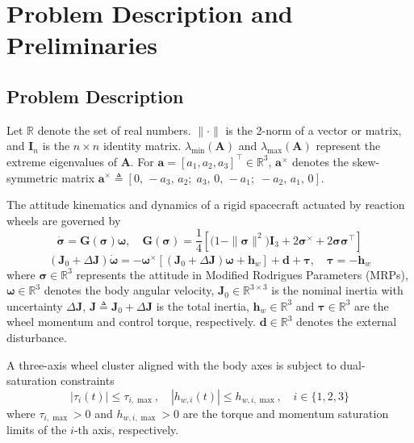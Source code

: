 \documentclass[journal]{new-aiaa}
\begin{document}
\section{Problem Description and Preliminaries}
\label{section:PROBLEM}

\subsection{Problem Description}
Let $\mathbb{R}$ denote the set of real numbers.
$\|\cdot\|$ is the 2-norm of a vector or matrix, and
$\boldsymbol{I}_n$ is the $n\times n$ identity matrix.
$\lambda_{\min}(\boldsymbol{A})$ and $\lambda_{\max}(\boldsymbol{A})$ represent the extreme eigenvalues of $\boldsymbol{A}$.
For $\boldsymbol{a}=[a_1,a_2,a_3]^\top\in\mathbb{R}^3$,
$\boldsymbol{a}^{\times}$ denotes the skew-symmetric matrix
$\boldsymbol{a}^{\times} \triangleq [0,\,-a_3,\,a_2;\; a_3,\,0,\,-a_1;\; -a_2,\,a_1,\,0]$.

The attitude kinematics and dynamics of a rigid spacecraft actuated by reaction wheels are governed by
\begin{equation}
\dot{\boldsymbol{\sigma}} = \boldsymbol{G}(\boldsymbol{\sigma}) \boldsymbol{\omega},
\quad \boldsymbol{G}(\boldsymbol{\sigma}) = \frac{1}{4} \left[ \big(1 - \|\boldsymbol{\sigma}\|^2 \big) \boldsymbol{I}_3 + 2 {\boldsymbol{\sigma}}^{\times} + 2 \boldsymbol{\sigma} \boldsymbol{\sigma}^\top \right]
\label{eq:attitude_kinematics}
\end{equation}
\begin{equation}
(\boldsymbol{J}_0 + \Delta\boldsymbol{J}) \dot{\boldsymbol{\omega}} =
- \boldsymbol{\omega}^{\times} [(\boldsymbol{J}_0 + \Delta\boldsymbol{J}) \boldsymbol{\omega} + \boldsymbol{h}_w ]
+ \boldsymbol{d} + \boldsymbol{\tau}, \quad \boldsymbol{\tau} = -\dot{\boldsymbol{h}}_w
\label{eq:attitude_dynamics}
\end{equation}
where $\boldsymbol{\sigma}\in\mathbb{R}^3$ represents the attitude in Modified Rodrigues Parameters (MRPs), $\boldsymbol{\omega}\in\mathbb{R}^3$ denotes the body angular velocity,
$\boldsymbol{J}_0\in\mathbb{R}^{3\times 3}$ is the nominal inertia with uncertainty $\Delta\boldsymbol{J}$,
$\boldsymbol{J}\triangleq\boldsymbol{J}_0+\Delta\boldsymbol{J}$ is the total inertia,
$\boldsymbol{h}_w\in\mathbb{R}^3$ and $\boldsymbol{\tau}\in\mathbb{R}^3$ are the wheel momentum and control torque, respectively. $\boldsymbol{d}\in\mathbb{R}^3$ denotes the external disturbance.

A three-axis wheel cluster aligned with the body axes is subject to dual-saturation constraints
\begin{equation}
|\tau_i(t)| \le \tau_{i,\max}, \quad
|h_{w,i}(t)| \le h_{w,i,\max}, \quad i \in \{1,2,3\}
\label{eq:dual_saturation}
\end{equation}
where $\tau_{i,\max}>0$ and $h_{w,i,\max}>0$ are the torque and momentum saturation limits of the $i$-th axis, respectively.
\end{document}
